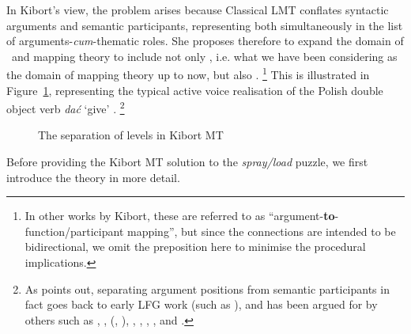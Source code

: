 \documentclass[output=paper]{langscibook}
\begin{document}
In Kibort's view, the problem arises because Classical LMT conflates syntactic
arguments and semantic participants, representing both simultaneously in the
list of arguments-\textit{cum}-thematic roles. She proposes therefore to expand
the domain of \astruc\ and mapping theory to include not only
, i.e. what we have been considering as the domain
of mapping theory up to now, but also .%
%
\footnote{In other works by Kibort, these are referred to as
  ``argument-\textbf{to}-function\slash participant mapping'', but since the
  connections are intended to be bidirectional, we omit the preposition here to
  minimise the procedural implications.}
%
This is illustrated in Figure~\ref{fig:exploded-astruc}, representing the typical active voice realisation of the Polish double object verb \textit{da\'{c}}
`give' \citep[cf.][265]{kibort14}.%
\footnote{As \citet[252]{Kibort2007} points out, separating argument positions from semantic participants in fact goes back to early LFG work (such as \citealt{bresnan1982the-passive}), and has been argued for by others such as \citet[1]{Grimshaw1988}, \citet{Mohanan1990}, \citeauthor{Ackerman1991} (\citeyear[12]{Ackerman1991}, \citeyear[57ff]{Ackerman1992}), \citet[15ff]{MohananT1994}, \citet{Joshi93}, \citet[37]{alsina1996the-role}, \citet[105]{falk2001lexical}, and \citet[40ff]{AckermanMoore2013}.}

\begin{figure}
\caption{The separation of levels in Kibort MT\label{fig:exploded-astruc}}
\end{figure}
%
Before providing the Kibort MT solution to the \textit{spray\slash load} puzzle,
we first introduce the theory in more detail.
\end{document}
